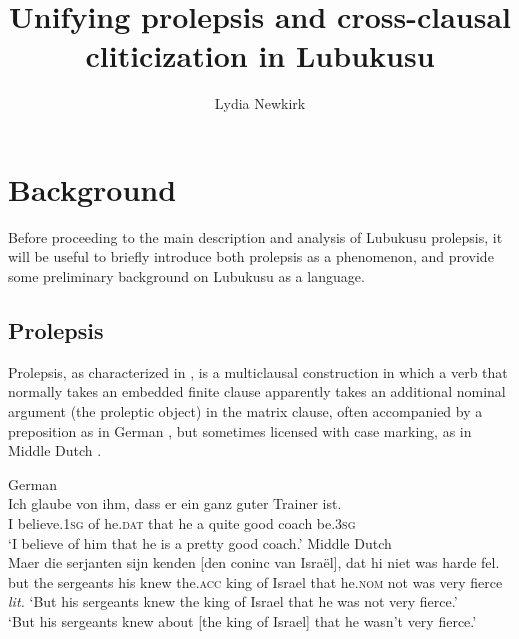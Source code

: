 \documentclass[output=paper,colorlinks,citecolor=brown]{langscibook}
\title{Unifying prolepsis and cross-clausal cliticization in Lubukusu}
\author{Lydia Newkirk\affiliation{Rutgers University}}
\begin{document}
\maketitle

\section{Background}\label{sec:newkirk:1}

Before proceeding to the main description and analysis of Lubukusu prolepsis, it will be useful to briefly introduce both prolepsis as a phenomenon, and provide some preliminary background on Lubukusu as a language.

\subsection{Prolepsis}\label{sec:newkirk:1.1}

Prolepsis, as characterized in \citet{Salzmann2017Chapter}, is a multiclausal construction in which a verb that normally takes an embedded finite clause apparently takes an additional nominal argument (the proleptic object) in the matrix clause, often accompanied by a preposition as in German , but sometimes licensed with case marking, as in Middle Dutch .\pagebreak

\ea%
    \label{ex:newkirk:1}
    German \citep{Salzmann2017Chapter}\\
	\gll    Ich glaube \alert{von} \alert{ihm}, dass \alert{er} ein ganz guter Trainer ist.\\
			I believe.\textsc{1sg} of he.\textsc{dat} that he a quite good coach be.\textsc{3sg}\\
	\glt    `I believe of him that he is a pretty good coach.'
\ex%
    \label{ex:newkirk:2}
    Middle Dutch \citep{VanKoppenEtAl2016}\\
	\gll    Maer die serjanten sijn kenden [\alert{den} \alert{coninc}                   \alert{van} \alert{Isra\"{e}l}], dat \alert{hi} niet was         harde fel.\\
	       but the sergeants his knew \hphantom{[}the.\textsc{acc} king of Israel that he.\textsc{nom} not was very fierce\\
	\glt   \textit{lit.} `But his sergeants knew the king of Israel that he was          not very fierce.'\\
	        `But his sergeants knew about [the king of Israel] that he wasn't very fierce.'
\z
\end{document}
